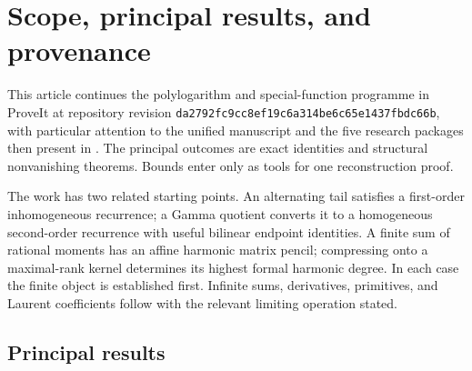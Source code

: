 \section{Scope, principal results, and provenance}
\label{scope:sec}

This article continues the polylogarithm and special-function programme
in ProveIt at repository revision
\texttt{da2792fc9cc8ef19c6a314be6c65e1437fbdc66b}, with particular attention
to the unified manuscript and the five research packages then present
in . The principal outcomes are exact identities
and structural nonvanishing theorems. Bounds enter only as tools for
one reconstruction proof.

The work has two related starting points. An alternating tail satisfies
a first-order inhomogeneous recurrence; a Gamma quotient converts it
to a homogeneous second-order recurrence with useful bilinear endpoint
identities. A finite sum of rational moments has an affine harmonic
matrix pencil; compressing onto a maximal-rank kernel determines its
highest formal harmonic degree. In each case the finite object is
established first. Infinite sums, derivatives, primitives, and Laurent
coefficients follow with the relevant limiting operation stated.

\subsection{Principal results}

